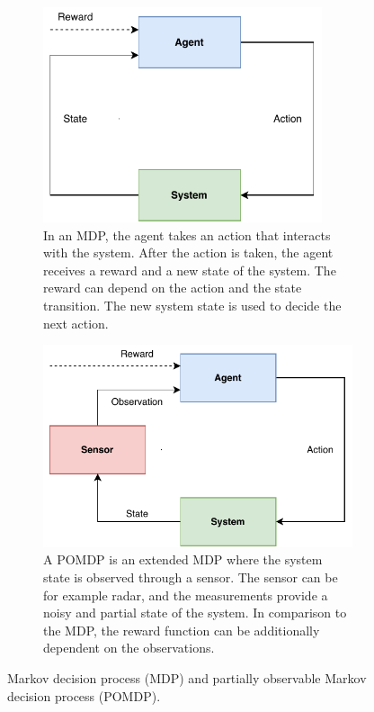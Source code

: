 \documentclass[english, 12pt, a4paper, elec, utf8, a-1b, online]{aaltothesis}
\begin{document}
\begin{figure}
    \centering
    \begin{subfigure}[b]{0.45\textwidth}
        \centering
        \includegraphics[width=0.9\textwidth]{figures/MDP.pdf}
        \caption{
        In an MDP, the agent takes an action that interacts with the system.
        After the action is taken, the agent receives a reward and a new state of the system.
        The reward can depend on the action and the state transition.
        The new system state is used to decide the next action.}
        \label{fig:mdp}
    \end{subfigure}
    \hfill
    \begin{subfigure}[b]{0.45\textwidth}
        \centering
        \includegraphics[width=\textwidth]{figures/POMDP.pdf}
        \caption{
        A POMDP is an extended MDP where the system state is observed through a sensor.
        The sensor can be for example radar, and the measurements provide a noisy and partial state of the system. 
        In comparison to the MDP, the reward function can be additionally dependent on the observations.
        }
        \label{fig:pomdp}
    \end{subfigure}
    \caption{Markov decision process (MDP) and partially observable Markov decision process (POMDP). }
    \label{fig:MDP_and_POMDP}
\end{figure}
\end{document}

